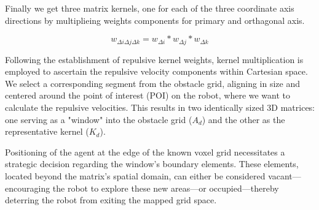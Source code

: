 \documentclass[letterpaper, 10 pt, conference]{ieeeconf}  %
\begin{document}
Finally we get three matrix kernels, one for each of the three coordinate axis directions by multiplieing weights components for primary and orthagonal axis.

\begin{equation}
	w_{\Delta i \Delta j \Delta k} = w_{\Delta i} * w_{\Delta j} * w_{\Delta k}
\end{equation}


Following the establishment of repulsive kernel weights, kernel multiplication is employed to ascertain the repulsive velocity components within Cartesian space. We select a corresponding segment from the obstacle grid, aligning in size and centered around the point of interest (POI) on the robot, where we want to calculate the repulsive velocities. This results in two identically sized 3D matrices: one serving as a "window" into the obstacle grid (\(A_d\)) and the other as the representative kernel (\(K_d\)).


Positioning of the agent at the edge of the known voxel grid necessitates a strategic decision regarding the window's boundary elements. These elements, located beyond the matrix's spatial domain, can either be considered vacant—encouraging the robot to explore these new areas—or occupied—thereby deterring the robot from exiting the mapped grid space.

\end{document}
